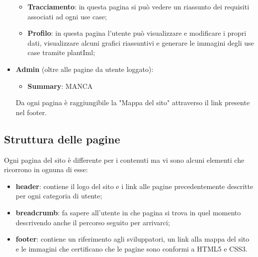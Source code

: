 \begin{itemize}
\begin{itemize}
		\item \textbf{Tracciamento}: in questa pagina si può vedere un riassunto dei requisiti associati ad ogni use case;
		\item \textbf{Profilo}: in questa pagina l'utente può visualizzare e modificare i propri dati, visualizzare alcuni grafici riassuntivi e generare le immagini degli use case tramite plantIml;
	\end{itemize}
	\item \textbf{Admin} (oltre alle pagine da utente loggato):
	\begin{itemize}
		\item \textbf{Summary}: MANCA
	\end{itemize}
Da ogni pagina è raggiungibile la "Mappa del sito" attraverso il link presente nel footer.
\end{itemize}
\subsection{Struttura delle pagine}
Ogni pagina del sito è differente per i contenuti ma vi sono alcuni elementi che ricorrono in ognuna di esse:
\begin{itemize}
	\item \textbf{header}: contiene il logo del sito e i link alle pagine precedentemente descritte per ogni categoria di utente;
	\item \textbf{breadcrumb}: fa sapere all'utente in che pagina si trova in quel momento descrivendo anche il percorso seguito per arrivarci;
	\item \textbf{footer}: contiene un riferimento agli sviluppatori, un link alla mappa del sito e le immagini che certificano che le pagine sono conformi a HTML5 e CSS3.
\end{itemize}